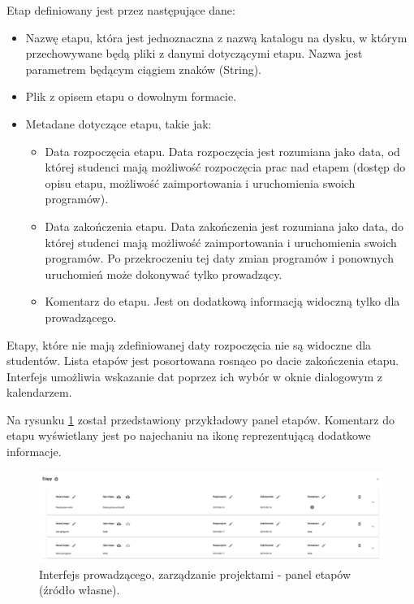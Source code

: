 Etap definiowany jest przez następujące dane:
\begin {itemize}
    \item Nazwę etapu, która jest jednoznaczna z nazwą katalogu na dysku, w którym przechowywane będą pliki z danymi dotyczącymi etapu.
    Nazwa jest parametrem będącym ciągiem znaków (String).
    \item Plik z opisem etapu o dowolnym formacie.
    \item Metadane dotyczące etapu, takie jak:
    \begin {itemize}
        \item Data rozpoczęcia etapu.
        Data rozpoczęcia jest rozumiana jako data, od której studenci mają możliwość rozpoczęcia prac nad etapem (dostęp do opisu etapu, możliwość zaimportowania i uruchomienia swoich programów).
        \item Data zakończenia etapu.
        Data zakończenia jest rozumiana jako data, do której studenci mają możliwość zaimportowania i uruchomienia swoich programów.
        Po przekroczeniu tej daty zmian programów i ponownych uruchomień może dokonywać tylko prowadzący.
        \item Komentarz do etapu.
        Jest on dodatkową informacją widoczną tylko dla prowadzącego.
    \end{itemize}
\end {itemize}

Etapy, które nie mają zdefiniowanej daty rozpoczęcia nie są widoczne dla studentów.
Lista etapów jest posortowana rosnąco po dacie zakończenia etapu.
Interfejs umożliwia wskazanie dat poprzez ich wybór w oknie dialogowym z kalendarzem.

Na rysunku \ref{fig:lecturer_stages} został przedstawiony przykładowy panel etapów.
Komentarz do etapu wyświetlany jest po najechaniu na ikonę reprezentującą dodatkowe informacje.

\begin{figure}[h]
    \centering
    \includegraphics[width = 15cm]{chapter04/lecturer_stages.png}
    \caption{Interfejs prowadzącego, zarządzanie projektami - panel etapów (źródło własne).}
    \label{fig:lecturer_stages}
\end{figure}

